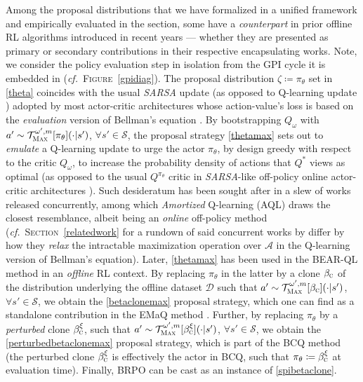 Among the proposal distributions that we have formalized in a unified framework and empirically evaluated
in the section,
some have a \emph{counterpart} in prior offline RL
algorithms introduced in recent years --- whether they are presented as primary or secondary contributions
in their respective encapsulating works.
Note, we consider the policy evaluation step in isolation from the GPI cycle
it is embedded in (\textit{cf.}~\textsc{Figure}~\ref{gpidiag}).
The proposal distribution $\zeta \coloneqq \pi_\theta$ set in \ref{theta} coincides with the usual
\textit{SARSA} update \cite{Rummery1994-qp, Thrun1995-sz, Sutton1996-ky, Van_Seijen2009-yw}
(as opposed to Q-learning update \cite{Watkins1989-ir, Watkins1992-gl})
adopted by most actor-critic architectures whose action-value's loss is based on the \textit{evaluation}
version of Bellman's equation
\cite{Silver2014-dk, Lillicrap2016-xa, Barth-Maron2018-ot, Haarnoja2018-bm,
Kumar2019-rw, Wu2019-nl, Kumar2020-zb, Siegel2020-lo, Wang2020-sr, Nair2020-gd}.
By bootstrapping $Q_\omega$ with $a' \sim \mathcal{T}_\textsc{Max}^{\omega', m}[\pi_\theta](\cdot | s')$,
$\forall s' \in \mathcal{S}$,
the proposal strategy \ref{thetamax} sets out to \textit{emulate} a Q-learning update to urge the actor
$\pi_\theta$, by design greedy with respect to the critic $Q_\omega$, to increase the probability density
of actions that $Q^*$ views as optimal (as opposed to the usual $Q^{\pi_\theta}$ critic in
\textit{SARSA}-like off-policy online actor-critic architectures \cite{Lim2018-ey}).
Such desideratum has been sought after in a slew of works released concurrently,
among which \textit{Amortized} Q-learning (AQL) \cite{Van_de_Wiele2018-qs}
draws the closest resemblance, albeit being an \textit{online} off-policy method
(\textit{cf.}~\textsc{Section}~\ref{relatedwork} for a rundown of said concurrent works by differ by
how they \emph{relax} the intractable maximization operation over $\mathcal{A}$
in the Q-learning version of Bellman's equation).
Later, \ref{thetamax} has been used in the BEAR-QL method \cite{Kumar2019-rw}
in an \emph{offline} RL context.
By replacing $\pi_\theta$ in the latter by a clone $\beta_\textsc{c}$
of the distribution underlying the offline dataset $\mathcal{D}$
such that $a' \sim \mathcal{T}_\textsc{Max}^{\omega', m}[\beta_\textsc{c}](\cdot | s')$,
$\forall s' \in \mathcal{S}$, we obtain the \ref{betaclonemax} proposal strategy,
which one can find as a standalone contribution in the EMaQ method \cite{Ghasemipour2020-ro}.
Further, by replacing $\pi_\theta$ by a \textit{perturbed} clone $\beta_\textsc{c}^\xi$,
such that $a' \sim \mathcal{T}_\textsc{Max}^{\omega', m}[\beta_\textsc{c}^\xi](\cdot | s')$,
$\forall s' \in \mathcal{S}$, we obtain the \ref{perturbedbetaclonemax} proposal strategy,
which is part of the BCQ method \cite{Fujimoto2018-mj} (the perturbed clone $\beta_\textsc{c}^\xi$ is
effectively the actor in BCQ, such that $\pi_\theta \coloneqq \beta_\textsc{c}^\xi$
at evaluation time).
Finally, BRPO \cite{Sohn2020-ay} can be cast as an instance of \ref{spibetaclone}.

